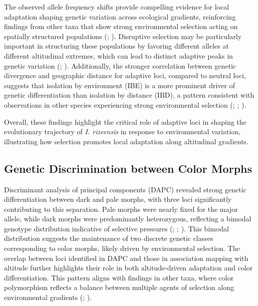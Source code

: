 \documentclass[9pt,a4paper,twoside]{rho-class/rho}
\begin{document}
        The observed allele frequency shifts provide compelling evidence for local adaptation shaping genetic variation across ecological gradients, reinforcing findings from other taxa that show strong environmental selection acting on spatially structured populations (\cite{Tigano2016}; \cite{Zancolli2019}). Disruptive selection may be particularly important in structuring these populations by favoring different alleles at different altitudinal extremes, which can lead to distinct adaptive peaks in genetic variation (\cite{Berdahl2015}; \cite{Forester2016}). Additionally, the stronger correlation between genetic divergence and geographic distance for adaptive loci, compared to neutral loci, suggests that isolation by environment (IBE) is a more prominent driver of genetic differentiation than isolation by distance (IBD), a pattern consistent with observations in other species experiencing strong environmental selection (\cite{Jiang2019}; \cite{Wagutu2022}; \cite{Wakamiya2023}).

        Overall, these findings highlight the critical role of adaptive loci in shaping the evolutionary trajectory of \textit{I. rizeensis} in response to environmental variation, illustrating how selection promotes local adaptation along altitudinal gradients.

    \subsection{Genetic Discrimination between Color Morphs}
    
        Discriminant analysis of principal components (DAPC) revealed strong genetic differentiation between dark and pale morphs, with three loci significantly contributing to this separation. Pale morphs were nearly fixed for the major allele, while dark morphs were predominantly heterozygous, reflecting a bimodal genotype distribution indicative of selective pressures (\cite{Prince2017}; \cite{Thompson2019}; \cite{PereiraMartins2022}). This bimodal distribution suggests the maintenance of two discrete genetic classes corresponding to color morphs, likely driven by environmental selection. The overlap between loci identified in DAPC and those in association mapping with altitude further highlights their role in both altitude-driven adaptation and color differentiation. This pattern aligns with findings in other taxa, where color polymorphism reflects a balance between multiple agents of selection along environmental gradients (\cite{Mullen2008}; \cite{Villoutreix2023}).
\end{document}
